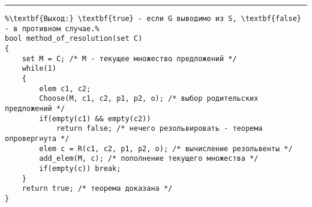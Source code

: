 \vspace{5pt} \hrule
\begin{lstlisting}[caption={Метод резолюций}, label=p_176, escapechar=\%]
%\noindent\textbf{Вход:} множество предложений C, полученных из множества формул S и формулы $\neg G$.\\%
%\textbf{Выход:} \textbf{true} - если G выводимо из S, \textbf{false} - в противном случае.%
bool method_of_resolution(set C)
{
	set M = C; /* M - текущее множество предложений */
	while(1)
	{
		elem c1, c2;
		Choose(M, c1, c2, p1, p2, o); /* выбор родительских предложений */
		if(empty(c1) && empty(c2))
			return false; /* нечего резольвировать - теорема опровергнута */
		elem c = R(c1, c2, p1, p2, o); /* вычисление резольвенты */
		add_elem(M, c); /* пополнение текущего множества */
		if(empty(c)) break;
	}
	return true; /* теорема доказана */
}
\end{lstlisting}
